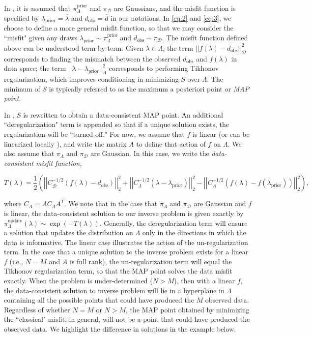 \documentclass{amsart}
\begin{document}
In \cite{Tarantola}, it is assumed that $\pi_\Lambda^\text{prior}$ and $\pi_\mathcal{D}$ are Gaussians, and the misfit function is specified by $\lambda_{\text{prior}}=\bar{\lambda}$ and $d_{\text{obs}}=\bar{d}$ in our notations. In \eqref{eq:2} and \eqref{eq:3}, we choose to define a more general misfit function, so that we may consider the ``misfit" given any draws $\lambda_{\text{prior}}\sim \pi_\Lambda^\text{prior}$ and $d_\text{obs} \sim \pi_\mathcal{D}$. The misfit function defined above can be understood term-by-term. Given $\lambda \in \Lambda$, the term $||f(\lambda)-d_{\text{obs}}||_\mathcal{D}^2$ corresponds to finding the mismatch between the observed $d_\text{obs}$ and $f(\lambda)$ in data space; the term $||\lambda-\lambda_{\text{prior}}||_\Lambda^2$ corresponds to performing Tikhonov regularization, which improves conditioning in minimizing $S$ over $\Lambda$. The minimum of $S$ is typically referred to as the maximum a posteriori point or \textit{MAP point}.

In \cite{wildeyprez},  $S$ is rewritten to obtain a data-consistent MAP point. 
An additional ``deregularization" term is appended so that if a unique solution exists, the regularization will be ``turned off." For now, we assume that $f$ is linear (or can be linearized locally \cite{Smith, Tarantola}), and write the matrix $A$ to define that action of $f$ on $\Lambda$. We also assume that $\pi_\Lambda$ and $\pi_\mathcal{D}$ are Gaussian. In this case, we write the \textit{data-consistent misfit function,}




\begin{equation} \label{eq:4}
T(\lambda)=\frac{1}{2}\left(\left|\left|C_\mathcal{D}^{-1/2}(f(\lambda)-d_{\text{obs}})\right|\right|_2^2+\left|\left|C_\Lambda^{-1/2}(\lambda-\lambda_{\text{prior}})\right|\right|_2^2-\left|\left|C_A^{-1/2}(f(\lambda)-f(\lambda_{\text{prior}}))\right|\right|_2^2\right),
\end{equation} 

\noindent where $C_A=AC_\Lambda A^T$. We note that in the case that $\pi_\Lambda$ and $\pi_\mathcal{D}$ are Gaussian and $f$ is linear, the data-consistent solution to our inverse problem is given exactly by $\pi_\Lambda^\text{update}(\lambda)\sim \exp(-T(\lambda))$. Generally, the deregularization term will ensure a solution that updates the distribution on $\Lambda$ only in the directions in which the data is informative. The linear case illustrates the action of the un-regularization term. In the case that a unique solution to the inverse problem exists for a linear $f$ (i.e., $N=M$ and $A$ is full rank), the un-regularization term will equal the Tikhonov regularization term, so that the MAP point solves the data misfit exactly. When the problem is under-determined ($N>M$), then with a linear $f$, the data-consistent solution to inverse problem will lie in a hyperplane in $\Lambda$ containing all the possible points that could have produced the $M$ observed data. Regardless of whether $N=M$ or $N>M$, the MAP point obtained by minimizing the ``classical" misfit, in general, will not be a point that could have produced the observed data. We highlight the difference in solutions in the example below.
\end{document}
